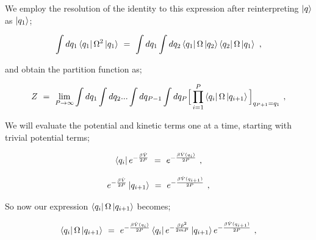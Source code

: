 \documentclass{article}
\begin{document}
We employ the resolution of the identity to this expression after reinterpreting \begin{math} \ket{q} \end{math} as \begin{math} \ket{q_1}\end{math}; 

\begin{equation} \label{eq:1}
\int dq_1 \bra{q_1} \Omega^2 \ket{q_1} \hspace{0.125cm} = \hspace{0.125cm} \int dq_1 \int dq_2 \bra{q_1} \Omega \ket{q_2} \bra{q_2} \Omega \ket{q_1} \hspace{0.125cm} , 
\end{equation}

and obtain the partition function as;

\begin{equation} \label{eq:1}
Z \hspace{0.125cm} = \hspace{0.125cm}  \lim_{P \rightarrow \infty} \int dq_1 \int dq_2 ... \int dq_{P - 1} \int dq_P \Big[ \prod_{i=1}^{P} \bra{q_i} \Omega  \ket{q_{i+1}} \Big]_{q_{P+1} = q_1} \hspace{0.125cm} , 
\end{equation}

We will evaluate the potential and kinetic terms one at a time, starting with trivial potential terms;

\begin{equation} \label{eq:1}
\bra{q_i} e^{-\frac{\beta \hat{V}}{2 P}} \hspace{0.125cm} = \hspace{0.125cm} e^{-\frac{\beta \hat{V}(q_i)}{2 P}} \hspace{0.125cm} , 
\end{equation}

\begin{equation} \label{eq:1}
e^{-\frac{\beta \hat{V}}{2 P}} \ket{q_{i+1}} \hspace{0.125cm} = \hspace{0.125cm} e^{-\frac{\beta \hat{V}(q_{i+1})}{2 P}} \hspace{0.125cm} , 
\end{equation}

So now our expression \begin{math} \bra{q_i} \Omega \ket{q_{i+1}} \end{math} becomes;

\begin{equation} \label{eq:1}
\bra{q_i} \Omega \ket{q_{i+1}} \hspace{0.125cm} = \hspace{0.125cm}  e^{-\frac{\beta \hat{V}(q_i)}{2 P}} \bra{q_i} e^{- \frac{\beta \hat{p}^2}{2 m P}} \ket{q_{i+1}} e^{-\frac{\beta \hat{V}(q_{i+1})}{2 P}}  \hspace{0.125cm} , 
\end{equation}
\end{document}
